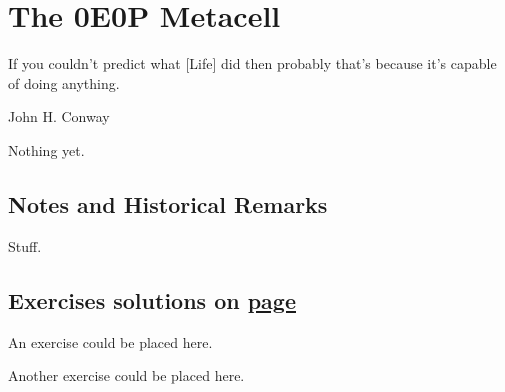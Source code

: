 
\renewcommand{\chapterfolder}{0e0p/}
\chapter{The 0E0P Metacell}\label{chp:0e0p}


\vspace*{-0.4in}
\epigraph{If you couldn't predict what [Life] did then probably that's because it's capable of doing anything.}{John H. Conway}
\vspace*{0.4in}


\noindent Nothing yet.



\section*{Notes and Historical Remarks}

Stuff.


\section*{Exercises \hfill \normalfont\textsf{\small solutions on \hyperlink{solutions_0e0p}{page \pageref{solutions_0e0p}}}}
\label{sec:solutions_0e0p}
\vspace*{-0.4cm}\hrulefill\vspace*{-0.3cm}\footnotesize\begin{multicols}{2}\vspace*{-0.4cm}\raggedcolumns{}
\setlength{\parskip}{0pt}


\begin{problem}\label{exer:0e0p_ex1}
	An exercise could be placed here.
\end{problem}


\mfilbreak


\begin{problem}\label{exer:0e0p_ex2}
	Another exercise could be placed here.
\end{problem}


\end{multicols}
\normalsize\vspace*{0.01cm}
